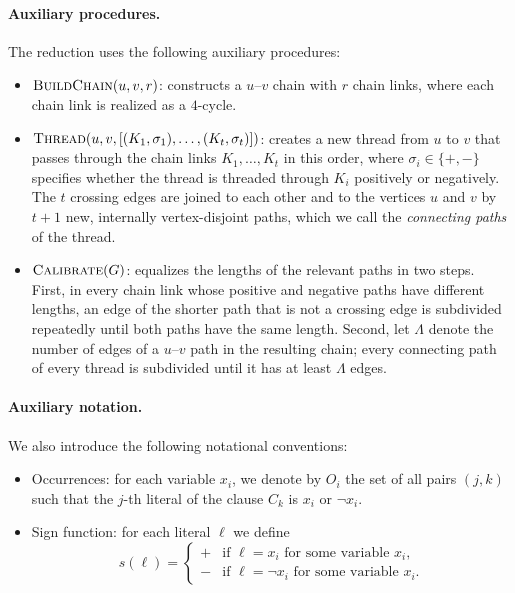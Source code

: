 \paragraph{Auxiliary procedures.}
The reduction uses the following auxiliary procedures:
\begin{itemize}
    \item $\textsc{BuildChain}(u,v,r)$: constructs a $u$--$v$ chain with $r$ chain links, where each chain link is realized as a $4$-cycle.
    \item $\textsc{Thread}(u,v,[(K_1,\sigma_1),\dots,(K_t,\sigma_t)])$: creates a new thread from $u$ to $v$ that passes through the chain links $K_1,\dots,K_t$ in this order, where $\sigma_i \in \{+,-\}$ specifies whether the thread is threaded through $K_i$ positively or negatively.
    The $t$ crossing edges are joined to each other and to the vertices $u$ and $v$ by $t+1$ new, internally vertex-disjoint paths, which we call the \emph{connecting paths} of the thread.
    \item $\textsc{Calibrate}(G)$: equalizes the lengths of the relevant paths in two steps.
    First, in every chain link whose positive and negative paths have different lengths, an edge of the shorter path that is not a crossing edge is subdivided repeatedly until both paths have the same length.
    Second, let $\Lambda$ denote the number of edges of a $u$--$v$ path in the resulting chain; every connecting path of every thread is subdivided until it has at least $\Lambda$ edges.
\end{itemize}

\paragraph{Auxiliary notation.}
We also introduce the following notational conventions:
\begin{itemize}
    \item Occurrences: for each variable $x_i$, we denote by $O_i$ the set of all pairs $(j,k)$ such that the $j$-th literal of the clause $C_k$ is $x_i$ or $\neg x_i$.
    \item Sign function: for each literal $\ell$ we define
\[
s(\ell) =
\begin{cases}
+ & \text{if $\ell = x_i$ for some variable $x_i$,}\\
- & \text{if $\ell = \neg x_i$ for some variable $x_i$.}
\end{cases}
\]
\end{itemize}

